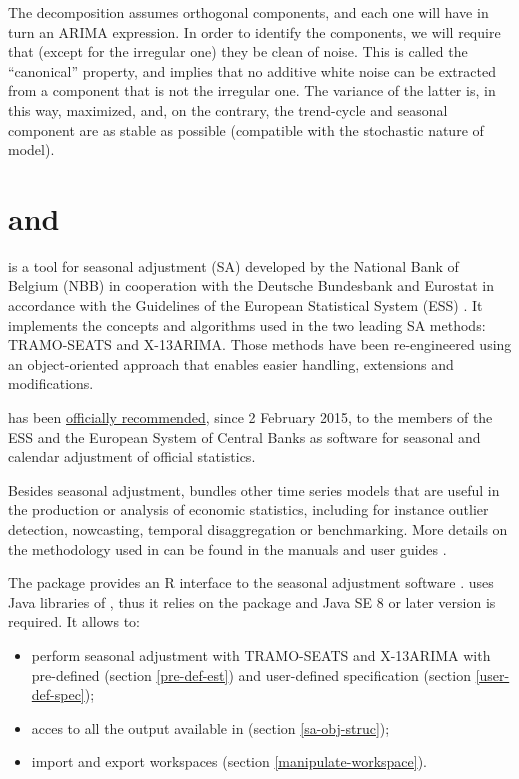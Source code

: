\documentclass[article]{jss}
\providecommand{\tightlist}{%
  \setlength{\itemsep}{0pt}\setlength{\parskip}{0pt}}
\begin{document}
The decomposition assumes orthogonal components, and each one will have
in turn an ARIMA expression. In order to identify the components, we
will require that (except for the irregular one) they be clean of noise.
This is called the ``canonical'' property, and implies that no additive
white noise can be extracted from a component that is not the irregular
one. The variance of the latter is, in this way, maximized, and, on the
contrary, the trend-cycle and seasonal component are as stable as
possible (compatible with the stochastic nature of model).

\section[JDemetra+ and RJDemetra]{ and }

 is a tool for seasonal adjustment (SA) developed by
the National Bank of Belgium (NBB) in cooperation with the Deutsche
Bundesbank and Eurostat in accordance with the Guidelines of the
European Statistical System (ESS) \citep{eurostat2015guidelines}. It
implements the concepts and algorithms used in the two leading SA
methods: TRAMO-SEATS and X-13ARIMA. Those methods have been
re-engineered using an object-oriented approach that enables easier
handling, extensions and modifications.

 has been
\href{https://ec.europa.eu/eurostat/cros/system/files/Jdemetra_\%20release.pdf}{officially
recommended}, since 2 February 2015, to the members of the ESS and the
European System of Central Banks as software for seasonal and calendar
adjustment of official statistics.

Besides seasonal adjustment,  bundles other time
series models that are useful in the production or analysis of economic
statistics, including for instance outlier detection, nowcasting,
temporal disaggregation or benchmarking. More details on the methodology
used in  can be found in the 
manuals and user guides
\citep{grudkowska2015jdemetrarm, grudkowska2015jdemetraug}.

The package  provides an R interface to the seasonal
adjustment software .  uses Java
libraries of , thus it relies on the 
\citep{rJava} package and Java SE 8 or later version is required. It
allows to:

\begin{itemize}
\tightlist
\item
  perform seasonal adjustment with TRAMO-SEATS and X-13ARIMA with
  pre-defined (section \ref{pre-def-est}) and user-defined specification
  (section \ref{user-def-spec});\\
\item
  acces to all the output available in  (section
  \ref{sa-obj-struc});\\
\item
  import and export  workspaces (section
  \ref{manipulate-workspace}).
\end{itemize}
\end{document}
